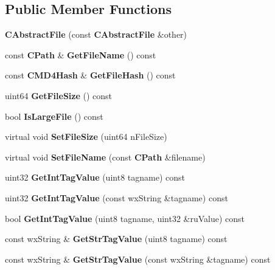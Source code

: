\subsection*{Public Member Functions}
\begin{DoxyCompactItemize}
\item 
{\bfseries CAbstractFile} (const {\bf CAbstractFile} \&other)\label{classCAbstractFile_a55e9b604269513f6d1f0c7f73448ccd1}

\item 
const {\bf CPath} \& {\bfseries GetFileName} () const \label{classCAbstractFile_ab4a3816fbc58772b336b9afba19f5bcd}

\item 
const {\bf CMD4Hash} \& {\bfseries GetFileHash} () const \label{classCAbstractFile_a0de068056cbc128357274cd442ff79ee}

\item 
uint64 {\bfseries GetFileSize} () const \label{classCAbstractFile_aa065454e627cf2b89ce01e69a77cb7d6}

\item 
bool {\bfseries IsLargeFile} () const \label{classCAbstractFile_af472a69a9b941d6f1739a56d70237c51}

\item 
virtual void {\bfseries SetFileSize} (uint64 nFileSize)\label{classCAbstractFile_a66a5f89ef73694ad98a50ea3a43b2f07}

\item 
virtual void {\bfseries SetFileName} (const {\bf CPath} \&filename)\label{classCAbstractFile_a28e4974cb0b6a22795bc6b12b13d3511}

\item 
uint32 {\bfseries GetIntTagValue} (uint8 tagname) const \label{classCAbstractFile_ace45d7bc66d6b9d8d100fb131546ce8a}

\item 
uint32 {\bfseries GetIntTagValue} (const wxString \&tagname) const \label{classCAbstractFile_af693a8b41fbc7486b174810e5764e83e}

\item 
bool {\bfseries GetIntTagValue} (uint8 tagname, uint32 \&ruValue) const \label{classCAbstractFile_a79bd79068e0c3f8a315798ac12f6aa5e}

\item 
const wxString \& {\bfseries GetStrTagValue} (uint8 tagname) const \label{classCAbstractFile_af6c9d189d560bf19b286abbaf1e6a86b}

\item 
const wxString \& {\bfseries GetStrTagValue} (const wxString \&tagname) const \label{classCAbstractFile_ac9ee7669cfb8fc31598fa55fad6708dc}


\end{DoxyCompactItemize}
